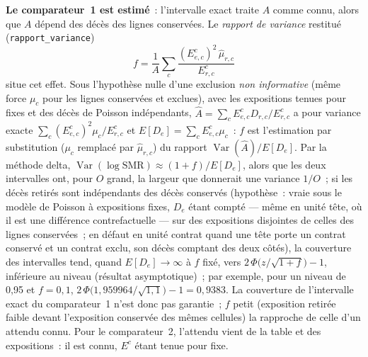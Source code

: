 \documentclass[a4paper,11pt]{article}
\newcommand{\code}[1]{\texttt{\small #1}}
\begin{document}
{\medskip
\textbf{Le comparateur~1 est estimé}~: l'intervalle exact traite $A$ comme
connu, alors que $A$ dépend des décès des lignes conservées. Le
\emph{rapport de variance} restitué (\code{rapport\_variance})
\[
  f = \frac{1}{A}\sum_c \frac{(E^c_{e,c})^2\,\hat\mu_{r,c}}{E^c_{r,c}}
\]
situe cet effet. Sous l'hypothèse nulle d'une exclusion \emph{non
informative} (même force $\mu_c$ pour les lignes conservées et exclues),
avec les expositions tenues pour fixes et des décès de Poisson
indépendants, $\hat A = \sum_c E^c_{e,c} D_{r,c}/E^c_{r,c}$ a pour variance
exacte $\sum_c (E^c_{e,c})^2 \mu_c / E^c_{r,c}$ et $E[D_e] = \sum_c
E^c_{e,c}\mu_c$~: $f$ est l'estimation par substitution ($\mu_c$ remplacé
par $\hat\mu_{r,c}$) du rapport $\operatorname{Var}(\hat A)/E[D_e]$. Par la
méthode delta, $\operatorname{Var}(\log \mathrm{SMR}) \approx (1 +
f)/E[D_e]$, alors que les deux intervalles ont, pour $O$ grand, la
largeur que donnerait une variance $1/O$~; si les décès retirés sont indépendants des décès conservés
(hypothèse~: vraie sous le modèle de Poisson à expositions fixes, $D_e$
étant compté --- même en unité tête, où il est une différence
contrefactuelle --- sur des expositions disjointes de celles des lignes
conservées~; en défaut en unité contrat quand une tête porte un contrat
conservé et un contrat exclu, son décès comptant des deux côtés), la couverture des intervalles tend, quand $E[D_e] \to \infty$
à $f$ fixé, vers $2\,\Phi\bigl(z/\sqrt{1 + f}\bigr) - 1$, inférieure au
niveau (résultat asymptotique)~; par exemple, pour un niveau de 0,95 et $f
= 0{,}1$, $2\,\Phi\bigl(1{,}959964/\sqrt{1{,}1}\bigr) - 1 = 0{,}9383$. La
couverture de l'intervalle exact du comparateur~1 n'est donc pas
garantie~; $f$ petit (exposition retirée faible devant l'exposition
conservée des mêmes cellules) la rapproche de celle d'un attendu connu. Pour
le comparateur~2, l'attendu vient de la table et des expositions~: il est
connu, $E^c$ étant tenue pour fixe.

}
\end{document}
